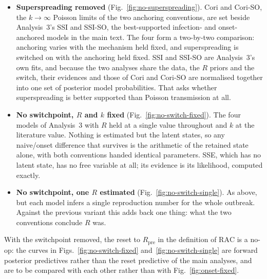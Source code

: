 \documentclass[11pt,a4paper]{article}
\theoremstyle{plain}
\theoremstyle{definition}
\newcommand{\Rpre}{R_{\mathrm{pre}}}
\newcommand{\RAC}{\mathrm{RAC}}
\newcommand{\sse}{SSE}
\newcommand{\ssi}{SSI}
\newcommand{\ssiso}{SSI-SO}
\newcommand{\cori}{Cori}
\newcommand{\coriso}{Cori-SO}
\begin{document}
\begin{itemize}
  \item \textbf{Superspreading removed} (Fig.~\ref{fig:no-superspreading}). \cori{} and
    \coriso{}, the $k \to \infty$ Poisson limits of the two anchoring conventions, are set beside
    Analysis~3's \ssi{} and \ssiso{}, the best-supported infection- and onset-anchored models in
    the main text. The four form a two-by-two comparison: anchoring varies with the mechanism
    held fixed, and superspreading is switched on with the anchoring held fixed. \ssi{} and
    \ssiso{} are Analysis~3's own fits, and because the two analyses share the data, the $R$
    priors and the switch, their evidences and those of \cori{} and \coriso{} are normalised
    together into one set of posterior model probabilities. That asks whether superspreading is
    better supported than Poisson transmission at all.
  \item \textbf{No switchpoint, $R$ and $k$ fixed} (Fig.~\ref{fig:no-switch-fixed}). The four
    models of Analysis~3 with $R$ held at a single value throughout and $k$ at the literature
    value. Nothing is estimated but the latent states, so any naive/onset difference that
    survives is the arithmetic of the retained state alone, with both conventions handed
    identical parameters. \sse{}, which has no latent state, has no free variable at all; its
    evidence is its likelihood, computed exactly.
  \item \textbf{No switchpoint, one $R$ estimated} (Fig.~\ref{fig:no-switch-single}). As above,
    but each model infers a single reproduction number for the whole outbreak. Against the
    previous variant this adds back one thing: what the two conventions conclude $R$ was.
\end{itemize}

With the switchpoint removed, the reset to $\Rpre$ in the definition of $\RAC$ is a no-op: the
curves in Figs.~\ref{fig:no-switch-fixed} and~\ref{fig:no-switch-single} are forward posterior
predictives rather than the reset predictive of the main analyses, and are to be compared with
each other rather than with Fig.~\ref{fig:onset-fixed}.
\end{document}

